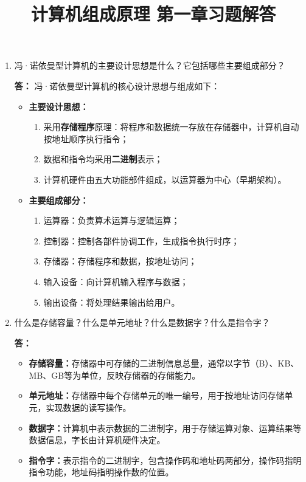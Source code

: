 \documentclass{article}
\title{计算机组成原理 第一章习题解答}
\author{}
\date{}
\begin{document}
\maketitle

\begin{enumerate}[label=\arabic*.]
    \item 冯·诺依曼型计算机的主要设计思想是什么？它包括哪些主要组成部分？
    
    \textbf{答：}
    冯·诺依曼型计算机的核心设计思想与组成如下：
    \begin{itemize}
        \item \textbf{主要设计思想：}
        \begin{enumerate}
            \item 采用\textbf{存储程序}原理：将程序和数据统一存放在存储器中，计算机自动按地址顺序执行指令；
            \item 数据和指令均采用\textbf{二进制}表示；
            \item 计算机硬件由五大功能部件组成，以运算器为中心（早期架构）。
        \end{enumerate}
        \item \textbf{主要组成部分：}
        \begin{enumerate}
            \item 运算器：负责算术运算与逻辑运算；
            \item 控制器：控制各部件协调工作，生成指令执行时序；
            \item 存储器：存储程序和数据，按地址访问；
            \item 输入设备：向计算机输入程序与数据；
            \item 输出设备：将处理结果输出给用户。
        \end{enumerate}
    \end{itemize}

    \item 什么是存储容量？什么是单元地址？什么是数据字？什么是指令字？
    
    \textbf{答：}
    \begin{itemize}
        \item \textbf{存储容量：}存储器中可存储的二进制信息总量，通常以字节（B）、KB、MB、GB等为单位，反映存储器的存储能力。
        \item \textbf{单元地址：}存储器中每个存储单元的唯一编号，用于按地址访问存储单元，实现数据的读写操作。
        \item \textbf{数据字：}计算机中表示数据的二进制字，用于存储运算对象、运算结果等数据信息，字长由计算机硬件决定。
        \item \textbf{指令字：}表示指令的二进制字，包含操作码和地址码两部分，操作码指明指令功能，地址码指明操作数的位置。
    \end{itemize}


\end{enumerate}
\end{document}
